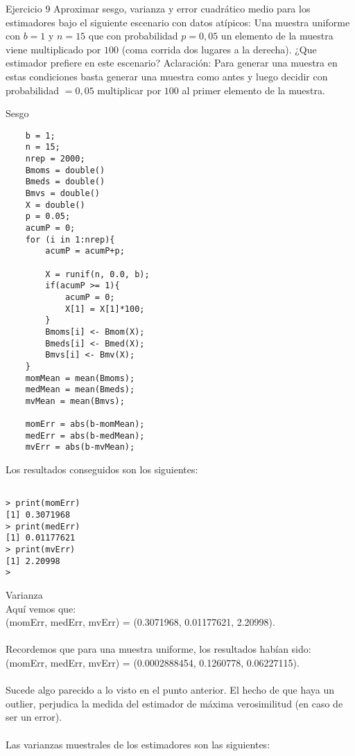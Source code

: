 



\begin{section}{Ejercicio 9}
Aproximar sesgo, varianza y error cuadrático medio para los estimadores bajo el siguiente
escenario con datos atípicos:
Una muestra uniforme con $b = 1$ y $n = 15$ que con probabilidad $p = 0,05$ un elemento de la
muestra viene multiplicado por $100$ (coma corrida dos lugares a la derecha). ¿Que estimador
prefiere en este escenario?
Aclaración: Para generar una muestra en estas condiciones basta generar una muestra como
antes y luego decidir con probabilidad $ = 0,05$ multiplicar por $100$ al primer elemento de la
muestra.

\begin{subsection}{Sesgo}~\\



\begin{verbatim}
	b = 1;
	n = 15;
	nrep = 2000;
	Bmoms = double()
	Bmeds = double()
	Bmvs = double()
	X = double()
	p = 0.05;
	acumP = 0;
	for (i in 1:nrep){
		acumP = acumP+p;

		X = runif(n, 0.0, b);
		if(acumP >= 1){
			acumP = 0;
			X[1] = X[1]*100;
		}
		Bmoms[i] <- Bmom(X);
		Bmeds[i] <- Bmed(X);
		Bmvs[i] <- Bmv(X);
	}
	momMean = mean(Bmoms);
	medMean = mean(Bmeds);
	mvMean = mean(Bmvs);

	momErr = abs(b-momMean);
	medErr = abs(b-medMean);
	mvErr = abs(b-mvMean);

\end{verbatim}
Los resultados conseguidos son los siguientes:

\begin{verbatim}

> print(momErr)
[1] 0.3071968
> print(medErr)
[1] 0.01177621
> print(mvErr)
[1] 2.20998
>
\end{verbatim}

\end{subsection}
\begin{subsection}{Varianza}~\\

Aquí vemos que:\\
(momErr, medErr, mvErr) = (0.3071968, 0.01177621, 2.20998).\\
~\\
Recordemos que para una muestra uniforme, los resultados habían sido:\\
(momErr, medErr, mvErr) = (0.0002888454, 0.1260778, 0.06227115).\\
~\\
Sucede algo parecido a lo visto en el punto anterior. El hecho de que haya un outlier, perjudica la medida del estimador de máxima verosimilitud (en caso de ser un error).\\
~\\
Las varianzas muestrales de los estimadores son las siguientes:


\end{subsection}
\end{section}
